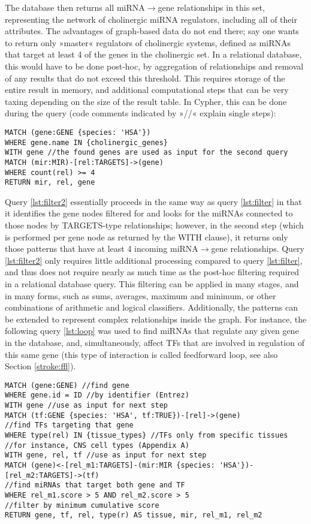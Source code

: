 The database then returns all miRNA$\to$gene relationships in this set, representing the network of cholinergic miRNA regulators, including all of their attributes. The advantages of graph-based data do not end there; say one wants to return only »master« regulators of cholinergic systems, defined as miRNAs that target at least 4 of the genes in the cholinergic set. In a relational database, this would have to be done post-hoc, by aggregation of relationships and removal of any results that do not exceed this threshold. This requires storage of the entire result in memory, and additional computational steps that can be very taxing depending on the size of the result table. In Cypher, this can be done during the query (code comments indicated by »\textcolor{dkgreen}{//}« explain single steps):

\begin{lstlisting}[label=lst:filter2,caption=Two-stage Filtering,
language=Cypher]
MATCH (gene:GENE {species: 'HSA'})
WHERE gene.name IN {cholinergic_genes}
WITH gene //the found genes are used as input for the second query
MATCH (mir:MIR)-[rel:TARGETS]->(gene)
WHERE count(rel) >= 4
RETURN mir, rel, gene
\end{lstlisting}

Query \ref{lst:filter2} essentially proceeds in the same way as query \ref{lst:filter} in that it identifies the gene nodes filtered for and looks for the miRNAs connected to those nodes by TARGETS-type relationships; however, in the second step (which is performed per gene node as returned by the \textcolor{dkblue}{WITH} clause), it returns only those patterns that have at least 4 incoming miRNA$\to$gene relationships. Query \ref{lst:filter2} only requires little additional processing compared to query \ref{lst:filter}, and thus does not require nearly as much time as the post-hoc filtering required in a relational database query. This filtering can be applied in many stages, and in many forms, such as sums, averages, maximum and minimum, or other combinations of arithmetic and logical classifiers. Additionally, the patterns can be extended to represent complex relationships inside the graph. For instance, the following query \ref{lst:loop} was used to find miRNAs that regulate any given gene in the database, and, simultaneously, affect TFs that are involved in regulation of this same gene (this type of interaction is called feedforward loop, see also Section \ref{stroke:ffl}).

\begin{lstlisting}[label=lst:loop,
caption=Feedforward Loop Identification,
language=Cypher]
MATCH (gene:GENE) //find gene
WHERE gene.id = ID //by identifier (Entrez)
WITH gene //use as input for next step
MATCH (tf:GENE {species: 'HSA', tf:TRUE})-[rel]->(gene) 
//find TFs targeting that gene
WHERE type(rel) IN {tissue_types} //TFs only from specific tissues
//for instance, CNS cell types (Appendix A)
WITH gene, rel, tf //use as input for next step
MATCH (gene)<-[rel_m1:TARGETS]-(mir:MIR {species: 'HSA'})-[rel_m2:TARGETS]->(tf) 
//find miRNAs that target both gene and TF
WHERE rel_m1.score > 5 AND rel_m2.score > 5 
//filter by minimum cumulative score
RETURN gene, tf, rel, type(r) AS tissue, mir, rel_m1, rel_m2
\end{lstlisting}

